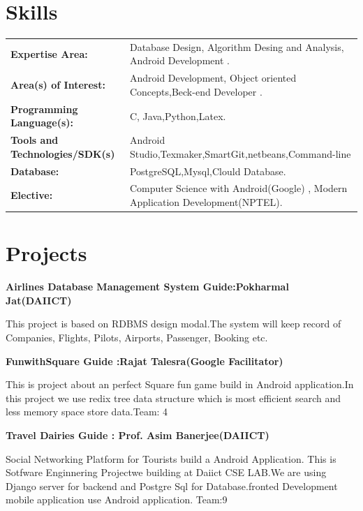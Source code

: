 \documentclass{article}
\begin{document}
\section{Skills}
\begin{tabular}{ll}
\textbf{Expertise Area:} & Database Design, Algorithm Desing and Analysis, Android Development . \\
\textbf{Area(s) of Interest:}& Android Development, Object oriented Concepts,Beck-end Developer .\\
\textbf{Programming Language(s):}& C, Java,Python,Latex.\\
\textbf{Tools and Technologies/SDK(s)} & Android Studio,Texmaker,SmartGit,netbeans,Command-line\\
\textbf{Database:} & PostgreSQL,Mysql,Clould Database.\\
\textbf{Elective:} & Computer Science with Android(Google) , Modern Application Development(NPTEL).

\end{tabular}


\section{Projects}

\begin{large}
\textbf{Airlines Database Management System \hspace*{3cm} Guide:Pokharmal      Jat(DAIICT) }
\end{large} 
This project is based on RDBMS design modal.The system
will keep record of Companies, Flights, Pilots, Airports, Passenger, Booking etc.

\begin{large}\textbf{FunwithSquare \hspace*{6.5cm} Guide  :Rajat Talesra(Google Facilitator)}
\end{large}
This is project about an perfect Square fun game  build in Android application.In this project we use redix tree data structure which is most efficient search and less memory space store data.\hspace*{5.5cm}Team: 4

\begin{large}\textbf{Travel Dairies \hspace{7cm} Guide : Prof. Asim Banerjee(DAIICT)}\end{large} 
Social Networking Platform for Tourists build a Android Application.
This is Sotfware Enginnering Projectwe building at Daiict CSE LAB.We are using Django server for backend and Postgre Sql for Database.fronted Development mobile application use Android application.\hspace{3cm} Team:9  
\end{document}
